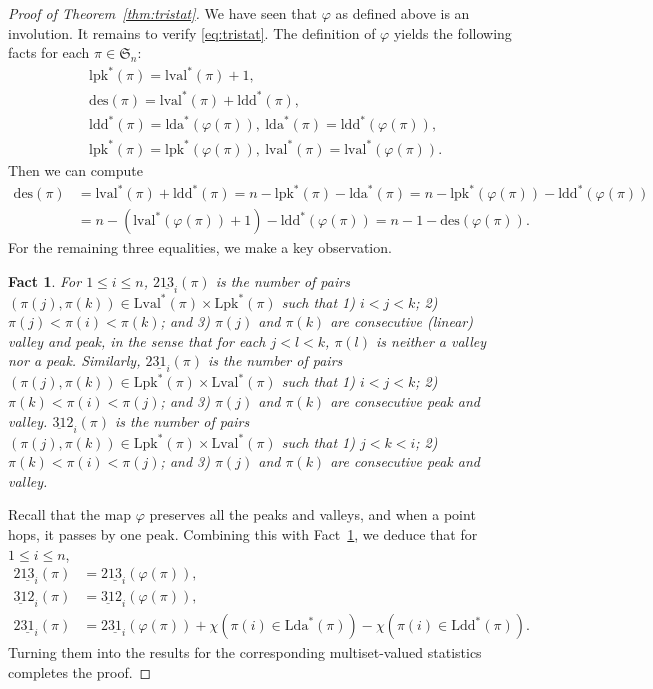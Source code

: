 \documentclass[12pt]{amsart}
\numberwithin{equation}{section}
\theoremstyle{plain}
\newtheorem{Fact}[theorem]{Fact}
\theoremstyle{definition}
\def\SS{\mathfrak{S}}
\def\des{\mathrm{des}}
\def\Lpk{\mathrm{Lpk}}
\def\Lval{\mathrm{Lval}}
\def\Lda{\mathrm{Lda}}
\def\Ldd{\mathrm{Ldd}}
\def\lpk{\mathrm{lpk}}
\def\lval{\mathrm{lval}}
\def\lda{\mathrm{lda}}
\def\ldd{\mathrm{ldd}}
\def\pprs{\mathrm{2\underline{13}}}
\def\ppwrs{\mathrm{2\underline{31}}}
\def\pp31-2{\mathrm{\underline{31}2}}
\begin{document}
\begin{proof}[Proof of Theorem~\ref{thm:tristat}]
We have seen that $\varphi$ as defined above is an involution. It remains to verify \eqref{eq:tristat}. The definition of $\varphi$ yields the following facts for each $\pi\in\SS_n$:
\begin{align*}
& \lpk^*(\pi)=\lval^*(\pi)+1,\\
& \des(\pi)=\lval^*(\pi)+\ldd^*(\pi),\\
& \ldd^*(\pi)=\lda^*(\varphi(\pi)),~\lda^*(\pi)=\ldd^*(\varphi(\pi)),\\
& \lpk^*(\pi)=\lpk^*(\varphi(\pi)),~\lval^*(\pi)=\lval^*(\varphi(\pi)).
\end{align*}
Then we can compute
\begin{align*}
\des(\pi) &= \lval^*(\pi)+\ldd^*(\pi) = n-\lpk^*(\pi)-\lda^*(\pi) = n-\lpk^*(\varphi(\pi))-\ldd^*(\varphi(\pi))\\
&= n-(\lval^*(\varphi(\pi))+1)-\ldd^*(\varphi(\pi)) = n-1-\des(\varphi(\pi)).
\end{align*}
For the remaining three equalities, we make a key observation.
\begin{Fact}\label{fact:pkval}
For $1\le i\le n$, $\pprs_i(\pi)$ is the number of pairs $(\pi(j),\pi(k))\in\Lval^*(\pi)\times\Lpk^*(\pi)$ such that 1) $i<j<k$; 2) $\pi(j)<\pi(i)<\pi(k)$; and 3) $\pi(j)$ and $\pi(k)$ are consecutive (linear) valley and peak, in the sense that for each $j<l<k$, $\pi(l)$ is neither a valley nor a peak. Similarly, $\ppwrs_i(\pi)$ is the number of pairs $(\pi(j),\pi(k))\in\Lpk^*(\pi)\times\Lval^*(\pi)$ such that 1) $i<j<k$; 2) $\pi(k)<\pi(i)<\pi(j)$; and 3) $\pi(j)$ and $\pi(k)$ are consecutive peak and valley. $\pp31-2_i(\pi)$ is the number of pairs $(\pi(j),\pi(k))\in\Lpk^*(\pi)\times\Lval^*(\pi)$ such that 1) $j<k<i$; 2) $\pi(k)<\pi(i)<\pi(j)$; and 3) $\pi(j)$ and $\pi(k)$ are consecutive peak and valley.
\end{Fact}
Recall that the map $\varphi$ preserves all the peaks and valleys, and when a point hops, it passes by one peak. Combining this with Fact~\ref{fact:pkval}, we deduce that for $1\le i\le n$,
\begin{align*}
\pprs_i(\pi) &=\pprs_i(\varphi(\pi)),\\
\pp31-2_i(\pi) &=\pp31-2_i(\varphi(\pi)),\\
\ppwrs_i(\pi) &=\ppwrs_i(\varphi(\pi))+\chi(\pi(i)\in\Lda^*(\pi))-\chi(\pi(i)\in\Ldd^*(\pi)).
\end{align*}
Turning them into the results for the corresponding multiset-valued statistics completes the proof.
\end{proof}
\end{document}

